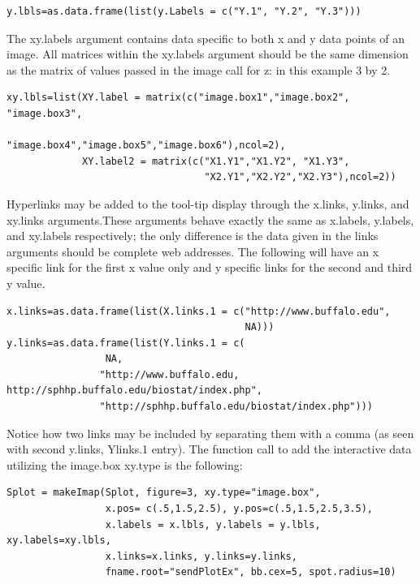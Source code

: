 \documentclass[]{article}
\begin{document}
\begin{verbatim}
y.lbls=as.data.frame(list(y.Labels = c("Y.1", "Y.2", "Y.3")))
\end{verbatim}

The xy.labels argument contains data specific to both x and y data points of an image. All matrices within the xy.labels argument should be the same dimension as the matrix of values passed in the image call for z: in this example 3 by 2. 

 

\begin{verbatim}
xy.lbls=list(XY.label = matrix(c("image.box1","image.box2", "image.box3",
                                 "image.box4","image.box5","image.box6"),ncol=2), 
             XY.label2 = matrix(c("X1.Y1","X1.Y2", "X1.Y3",
                                  "X2.Y1","X2.Y2","X2.Y3"),ncol=2))
\end{verbatim}

Hyperlinks may be added to the tool-tip display through the x.links, y.links, and xy.links arguments.These arguments behave exactly the same as x.labels, y.labels, and xy.labels respectively;  the only difference is the data given in the links arguments should be complete web addresses. The following will have an x specific link for the first x value only and y specific links for the second and third y value. 



\begin{verbatim}
x.links=as.data.frame(list(X.links.1 = c("http://www.buffalo.edu", 
                                         NA)))
y.links=as.data.frame(list(Y.links.1 = c(
                 NA,
                "http://www.buffalo.edu, http://sphhp.buffalo.edu/biostat/index.php",
                "http://sphhp.buffalo.edu/biostat/index.php")))
\end{verbatim}

Notice how two links may be included by separating them with a comma (as seen with second y.links, Ylinks.1 entry). The function call to add the interactive data utilizing the image.box xy.type is the following:




\begin{verbatim}
Splot = makeImap(Splot, figure=3, xy.type="image.box", 
                 x.pos= c(.5,1.5,2.5), y.pos=c(.5,1.5,2.5,3.5),
                 x.labels = x.lbls, y.labels = y.lbls, xy.labels=xy.lbls,
                 x.links=x.links, y.links=y.links, 
                 fname.root="sendPlotEx", bb.cex=5, spot.radius=10)
\end{verbatim}
\end{document}
